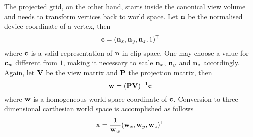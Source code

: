 The projected grid, on the other hand, starts inside the canonical view volume
and needs to transform vertices back to world space. Let $\mathbf{n}$ be the
normalised device coordinate of a vertex, then
\begin{equation}
\label{eq:ndc_to_cs}
 \mathbf{c} = (\mathbf{n}_x, \mathbf{n}_y, \mathbf{n}_z, 1)^{\mathsf{T}}
\end{equation}
where $\mathbf{c}$ is a valid representation of $\mathbf{n}$ in clip space. One may choose
a value for $\mathbf{c}_w$ different from $1$, making it necessary to scale $\mathbf{n}_x$,
$\mathbf{n}_y$ and $\mathbf{n}_z$ accordingly. Again, let $\mathbf{V}$ be the view matrix and
$\mathbf{P}$ the projection matrix, then
\begin{equation}
\label{eq:cs_to_wsh}
 \mathbf{w} = (\mathbf{P} \mathbf{V})^{\mathsf{-1}} \mathbf{c}
\end{equation}
where $\mathbf{w}$ is a homogeneous world space coordinate of $\mathbf{c}$. Conversion
to three dimensional carthesian world space is accomplished as follows
\begin{equation}
\label{eq:wsh_to_ws}
 \mathbf{x} = \frac{1}{\mathbf{w}_w}(\mathbf{w}_x, \mathbf{w}_y, \mathbf{w}_z)^{\mathsf{T}}
\end{equation}

